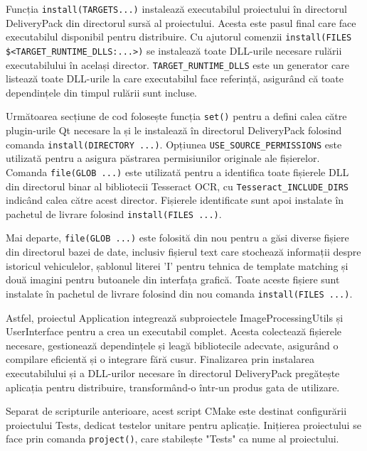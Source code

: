 \documentclass[a4paper,12pt]{report}
\begin{document}
Funcția \texttt{install(TARGETS...)} instalează executabilul proiectului în directorul DeliveryPack din directorul sursă al proiectului. Acesta este pasul final care face executabilul disponibil pentru distribuire. Cu ajutorul comenzii \newline \texttt{install(FILES \$<TARGET\_RUNTIME\_DLLS:...>)} se instalează toate DLL-urile necesare rulării executabilului în același director. \texttt{TARGET\_RUNTIME\_DLLS} este un generator care listează toate DLL-urile la care executabilul face referință, asigurând că toate dependințele din timpul rulării sunt incluse.

Următoarea secțiune de cod folosește funcția \texttt{set()} pentru a defini calea către plugin-urile Qt necesare la  și le instalează în directorul DeliveryPack folosind comanda \texttt{install(DIRECTORY ...)}. Opțiunea \newline \texttt{USE\_SOURCE\_PERMISSIONS} este utilizată pentru a asigura păstrarea permisiunilor originale ale fișierelor. Comanda \texttt{file(GLOB ...)} este utilizată pentru a identifica toate fișierele DLL din directorul binar al bibliotecii Tesseract OCR, cu \newline \texttt{Tesseract\_INCLUDE\_DIRS} indicând calea către acest director. Fișierele identificate sunt apoi instalate în pachetul de livrare folosind \texttt{install(FILES ...)}.

Mai departe, \texttt{file(GLOB ...)} este folosită din nou pentru a găsi diverse fișiere din directorul bazei de date, inclusiv fișierul text care stochează informații despre istoricul vehiculelor, șablonul literei 'I' pentru tehnica de template matching și două imagini pentru butoanele din interfața grafică. Toate aceste fișiere sunt instalate în pachetul de livrare folosind din nou comanda \texttt{install(FILES ...)}.

Astfel,  proiectul Application integrează subproiectele ImageProcessingUtils și UserInterface pentru a crea un executabil complet. Acesta colectează fișierele necesare, gestionează dependințele și leagă bibliotecile adecvate, asigurând o compilare eficientă și o integrare fără cusur. Finalizarea prin instalarea executabilului și a DLL-urilor necesare în directorul DeliveryPack pregătește aplicația pentru distribuire, transformând-o într-un produs gata de utilizare.

Separat de scripturile anterioare, acest script CMake este destinat configurării proiectului Tests, dedicat testelor unitare pentru aplicație. Inițierea proiectului se face prin comanda \texttt{project()}, care stabilește "Tests" ca nume al proiectului.
\end{document}
